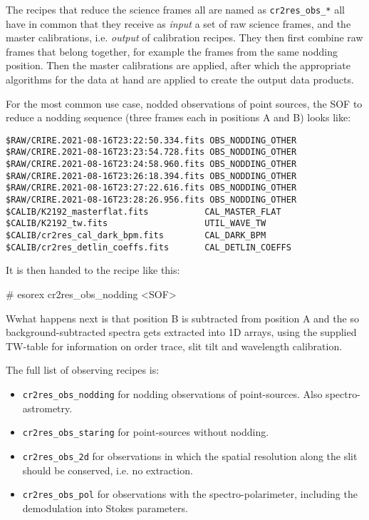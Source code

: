 The recipes that reduce the science frames all are named as
\texttt{cr2res\_obs\_*}
all have in common that they receive as \textit{input} a set of raw science
frames, and the master calibrations, i.e. \textit{output}
of calibration recipes. They then first combine raw frames that belong together,
for example the frames from the same nodding position. Then the master
calibrations are applied, after which the appropriate algorithms for the data at
hand are applied to create the output data products.

For the most common use case, nodded observations of point sources,
the SOF to reduce a nodding sequence (three frames  each in positions A and B)
looks like:
\begin{verbatim}
$RAW/CRIRE.2021-08-16T23:22:50.334.fits OBS_NODDING_OTHER
$RAW/CRIRE.2021-08-16T23:23:54.728.fits OBS_NODDING_OTHER
$RAW/CRIRE.2021-08-16T23:24:58.960.fits OBS_NODDING_OTHER
$RAW/CRIRE.2021-08-16T23:26:18.394.fits OBS_NODDING_OTHER
$RAW/CRIRE.2021-08-16T23:27:22.616.fits OBS_NODDING_OTHER
$RAW/CRIRE.2021-08-16T23:28:26.956.fits OBS_NODDING_OTHER
$CALIB/K2192_masterflat.fits           CAL_MASTER_FLAT
$CALIB/K2192_tw.fits                   UTIL_WAVE_TW
$CALIB/cr2res_cal_dark_bpm.fits        CAL_DARK_BPM
$CALIB/cr2res_detlin_coeffs.fits       CAL_DETLIN_COEFFS
\end{verbatim}

It is then handed to the recipe like this:
\begin{shell}
    # esorex cr2res_obs_nodding <SOF>
\end{shell}

Wwhat happens next is that position B is subtracted from position A and the so
background-subtracted spectra gets extracted into 1D arrays, using the supplied
TW-table for information on order trace, slit tilt and wavelength calibration.

The full list of observing recipes is:
\begin{itemize}
    \item \texttt{cr2res\_obs\_nodding} for nodding observations of
        point-sources. Also spectro-astrometry.
    \item \texttt{cr2res\_obs\_staring} for point-sources without nodding.
    \item \texttt{cr2res\_obs\_2d} for observations in which the spatial
        resolution along the slit should be conserved, i.e. no extraction.
    \item \texttt{cr2res\_obs\_pol} for observations with the spectro-polarimeter,
        including the demodulation into Stokes parameters. 
\end{itemize}



